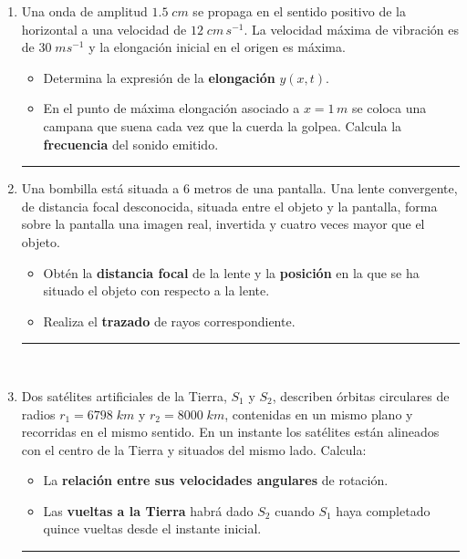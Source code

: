 \documentclass[a4paper,12pt]{exam}
\newcommand{\halmos}{\vspace*{-7mm}
	
					\begin{flushright}
						\rule{1mm}{2.5mm} 
					\end{flushright}\vspace*{-10mm}
						
					  }
\renewcommand{\qed}{\halmos}
\begin{document}
\newpage
{}

    \marginsize{.5cm}{.8cm}{1cm}{0cm}
    
  \vspace*{-5ex}
    
\begin{enumerate}


	\item Una onda de amplitud $1.5\;cm$ se propaga en el sentido positivo de la horizontal a una velocidad de $12\;cm\,s^{-1}$. La velocidad máxima de vibración es de $30\;m s^{-1}$ y la elongación inicial en el origen es máxima.
	\begin{itemize}
		\item[a)] Determina la expresión de la \textbf{elongación} $y(x,t)$.
		\item[b)]  En el punto de máxima elongación asociado a $x=1\,m$ se coloca una campana que suena cada vez que la cuerda la golpea. Calcula la \textbf{frecuencia} del sonido emitido.
	\end{itemize}
	\qed
			

		\item Una bombilla está situada a $6$ metros de una pantalla. Una lente convergente, de  distancia  focal  desconocida,  situada  entre  el  objeto  y  la  pantalla,  forma  sobre  la  pantalla  una  imagen real, invertida y cuatro veces mayor que el objeto.
	\begin{itemize}
		\item[a)] Obtén la \textbf{distancia focal} de la lente y la \textbf{posición} en la que se ha situado el objeto con respecto a la lente.
		\item[b)] Realiza el \textbf{trazado} de rayos correspondiente.
	\end{itemize}
	\qed	
	
\
	\item Dos satélites artificiales de la Tierra, $S_1$ y $S_2$, describen órbitas circulares de radios $r_1=6798 \;km$ y $r_2=8000\;km$, contenidas en un mismo plano y recorridas en el mismo sentido. En un instante  los satélites están alineados con el centro de la Tierra y situados del mismo lado. Calcula:
 		\begin{itemize}
 			\item[a)] La \textbf{relación entre sus velocidades angulares} de rotación.
 			\item[b)] Las \textbf{vueltas a la Tierra} habrá dado $S_2$ cuando $S_1$ haya completado quince vueltas desde el instante inicial.
 		\end{itemize}
 		\qed
 		

\end{enumerate}
\end{document}
